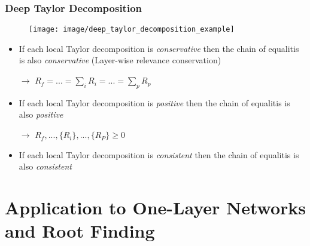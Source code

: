 \documentclass{beamer}
\begin{document}
\begin{frame}
\frametitle{Deep Taylor Decomposition}
\vspace{0.25cm}
\begin{figure}
\texttt{[image: image/deep\_taylor\_decomposition\_example]}
 \end{figure}

\begin{itemize}
\item  If each local Taylor decomposition is \textit{conservative} then the chain of equalitis is also \textit{conservative} (Layer-wise relevance conservation)
\item[$\rightarrow$] $R_f = ...= \sum_i R_i = ... = \sum_p R_p$
\item  If each local Taylor decomposition is \textit{positive} then the chain of equalitis is also \textit{positive} 
\item[$\rightarrow$] $R_f,...,\{R_i\},...,\{R_P\} \geq 0$
\item If each local Taylor decomposition is \textit{consistent} then the chain of equalitis is also \textit{consistent} 
\end{itemize}


\end{frame}

\section[One-Layer Networks]{Application to One-Layer Networks and Root Finding}
\end{document}
